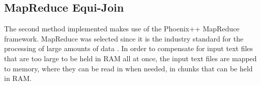 \documentclass[10pt,twocolumn]{witseiepaper}
\begin{document}
\subsection{MapReduce Equi-Join}
The second method implemented makes use of the Phoenix++ MapReduce framework. MapReduce was selected since it is the industry standard for the processing of large amounts of data \cite{comparingMPIMapReduce}. In order to compensate for input text files that are too large to be held in RAM all at once, the input text files are mapped to memory, where they can be read in when needed, in chunks that can be held in RAM.

%
%
%
%
%
%
%
%
\end{document}

